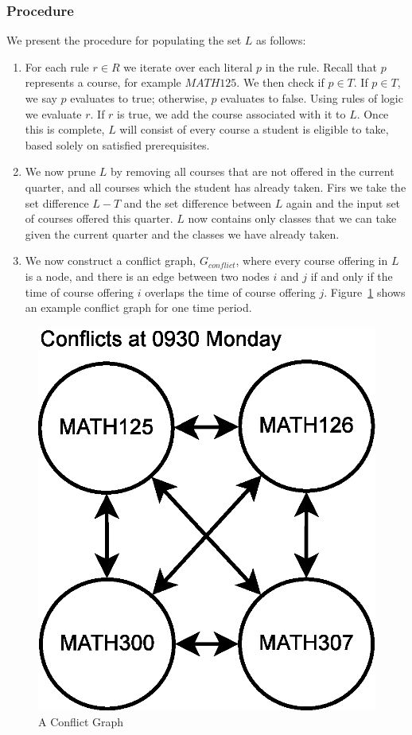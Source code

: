 \documentclass[11pt]{article} %
\begin{document}
\subsubsection{Procedure} We present the procedure for populating the set $L$ as
follows: \begin{enumerate} \item For each rule $r \in R$ we iterate over each
literal $p$ in the rule.  Recall that $p$ represents a course, for example
$MATH125$.  We then check if $p \in T$.  If $p \in T$, we say $p$ evaluates
to true; otherwise, $p$ evaluates to false.  Using rules of logic we evaluate
$r$.  If $r$ is true, we add the course associated with it to $L$.  Once this
is complete, $L$ will consist of every course a student is eligible to take, based solely
on satisfied prerequisites.  \item We now prune $L$ by removing all courses that
are not offered in the current quarter, and all courses which the student has
already taken. Firs we take the set difference $L-T$ and the set difference
between $L$ again and the input set of courses offered this quarter.  $L$ now
contains only classes that we can take given the current quarter and the classes
we have already taken.  \item We now construct a conflict graph, $G_{conflict}$,
where every course offering in $L$ is a node, and there is an edge between two
nodes $i$ and $j$ if and only if the time of course offering $i$ overlaps the
time of course offering $j$.  Figure~\ref{conflictg} shows an example conflict
graph for one time period.  \end{enumerate} \begin{figure} [ht] \begin{center}
\includegraphics[scale=0.35]{conflict_graph_ex} \end{center} \caption{A Conflict
Graph} \label{conflictg} \end{figure}
\end{document}
